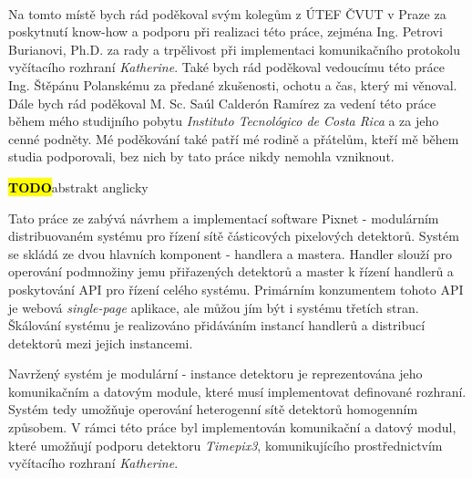 \documentclass[11pt,twoside,a4paper]{book}
\newcommand*{\todo}{\hl{\textbf{TODO}}} %
\begin{document}
	\translate				%


	\coverpagestarts

	\newpage~
	
	
	\newpage

	\acknowledgements
	\noindent
	Na tomto místě bych rád poděkoval svým kolegům z ÚTEF ČVUT v Praze za poskytnutí know-how a podporu při realizaci této práce, zejména Ing. Petrovi Burianovi, Ph.D. za rady a trpělivost při implementaci komunikačního protokolu vyčítacího rozhraní \textit{Katherine}. Také bych rád poděkoval vedoucímu této práce Ing. Štěpánu Polanskému za předané zkušenosti, ochotu a čas, který mi věnoval. Dále bych rád poděkoval M. Sc. Saúl Calderón Ramírez za vedení této práce během mého studijního pobytu \textit{Instituto Tecnológico de Costa Rica} a za jeho cenné podněty. Mé poděkování také patří mé rodině a přátelům, kteří mě během studia podporovali, bez nich by tato práce nikdy nemohla vzniknout.





 
	\abstractpage

	\todo abstrakt anglicky

	\abstractpagecz
	Tato práce ze zabývá návrhem a implementací software Pixnet - modulárním distribuovaném systému pro řízení sítě částicových pixelových detektorů. Systém se skládá ze dvou hlavních komponent - handlera a mastera. Handler slouží pro operování podmnožiny jemu přiřazených detektorů a master k řízení handlerů a poskytování API pro řízení celého systému. Primárním konzumentem tohoto API je webová \textit{single-page} aplikace, ale můžou jím být i systému třetích stran. Škálování systému je realizováno přidáváním instancí handlerů a distribucí detektorů mezi jejich instancemi.
	
	Navržený systém je modulární - instance detektoru je reprezentována jeho komunikačním a datovým module, které musí implementovat definované rozhraní. Systém tedy umožňuje operování heterogenní sítě detektorů homogenním způsobem. V rámci této práce byl implementován komunikační a datový modul, které umožňují podporu detektoru \textit{Timepix3}, komunikujícího prostřednictvím vyčítacího rozhraní \textit{Katherine}.
\end{document}
